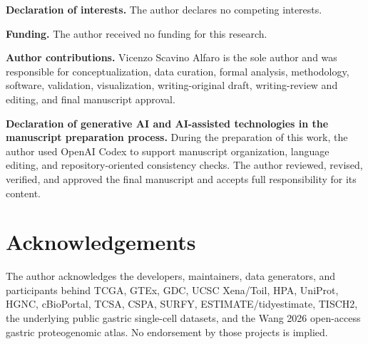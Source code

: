 \documentclass[review,12pt,authoryear]{elsarticle}
\begin{document}
\textbf{Declaration of interests.} The author declares no competing interests.

\textbf{Funding.} The author received no funding for this research.

\textbf{Author contributions.} Vicenzo Scavino Alfaro is the sole author and was responsible for conceptualization, data curation, formal analysis, methodology, software, validation, visualization, writing-original draft, writing-review and editing, and final manuscript approval.

\textbf{Declaration of generative AI and AI-assisted technologies in the manuscript preparation process.} During the preparation of this work, the author used OpenAI Codex to support manuscript organization, language editing, and repository-oriented consistency checks. The author reviewed, revised, verified, and approved the final manuscript and accepts full responsibility for its content.

\FloatBarrier
\section{Acknowledgements}

The author acknowledges the developers, maintainers, data generators, and participants behind TCGA, GTEx, GDC, UCSC Xena/\allowbreak{}Toil, HPA, UniProt, HGNC, cBioPortal, TCSA, CSPA, SURFY, ESTIMATE/\allowbreak{}tidyestimate, TISCH2, the underlying public gastric single-cell datasets, and the Wang 2026 open-access gastric proteogenomic atlas. No endorsement by those projects is implied.


\end{document}

